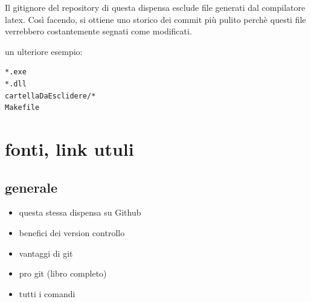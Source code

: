 \documentclass{article}
\begin{document}
Il gitignore del repository di questa dispensa esclude file generati dal
compilatore latex. Così facendo, si ottiene uno storico dei commit più pulito
perchè questi file verrebbero costantemente segnati come modificati.

un ulteriore esempio:

\begin{verbatim}
*.exe
*.dll
cartellaDaEsclidere/*
Makefile
\end{verbatim}

\section{fonti, link utuli}

\subsection{generale}
\begin{itemize}
    \item {}
        {questa stessa dispensa su Github}
    \item {}
        {benefici dei version controllo}
    \item {}
        {vantaggi di git}
    \item {}
        {pro git (libro completo)}
    \item {}
        {tutti i comandi}
\end{itemize}
\end{document}
